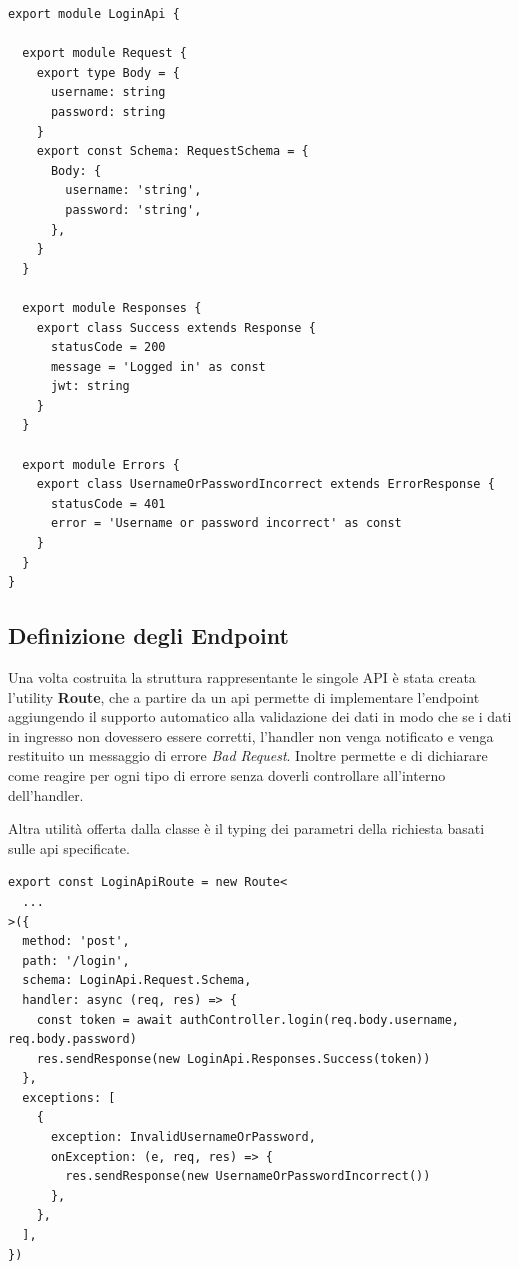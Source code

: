 \begin{lstlisting}[style=typescript, caption={Definizione API}, label=lst:login:api]
export module LoginApi {

  export module Request {
    export type Body = {
      username: string
      password: string
    }
    export const Schema: RequestSchema = {
      Body: {
        username: 'string',
        password: 'string',
      },
    }
  }

  export module Responses {
    export class Success extends Response {
      statusCode = 200
      message = 'Logged in' as const
      jwt: string
    }
  }

  export module Errors {
    export class UsernameOrPasswordIncorrect extends ErrorResponse {
      statusCode = 401
      error = 'Username or password incorrect' as const
    }
  }
}
\end{lstlisting}

%
%
%
\subsection{Definizione degli Endpoint}

Una volta costruita la struttura rappresentante le singole API è stata creata l'utility \textbf{Route}, che a partire da un api permette di implementare l'endpoint aggiungendo il supporto automatico alla validazione dei dati in modo che se i dati in ingresso non dovessero essere corretti,  l'handler non venga notificato e venga restituito un messaggio di errore \textit{Bad Request}.
%
Inoltre permette e di dichiarare come reagire per ogni tipo di errore senza doverli controllare all'interno dell'handler.

Altra utilità offerta dalla classe è il typing dei parametri della richiesta basati sulle api specificate.

\begin{lstlisting}[style=typescript, caption={Definizione API}, label=lst:login:route]
export const LoginApiRoute = new Route<
  ...
>({
  method: 'post',
  path: '/login',
  schema: LoginApi.Request.Schema,
  handler: async (req, res) => {
    const token = await authController.login(req.body.username, req.body.password)
    res.sendResponse(new LoginApi.Responses.Success(token))
  },
  exceptions: [
    {
      exception: InvalidUsernameOrPassword,
      onException: (e, req, res) => {
        res.sendResponse(new UsernameOrPasswordIncorrect())
      },
    },
  ],
})
\end{lstlisting}

